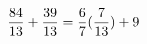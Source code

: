 \documentclass[preview]{standalone}
\begin{document}
\begin{align*}
\special{dvisvgm:raw <g id='unique000'>}\frac{84}{13} + \frac{39}{13} = \frac{6}{7} (\frac{7}{13}) + 9\special{dvisvgm:raw </g>}
\end{align*}
\end{document}
